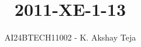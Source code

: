 \documentclass[journal,9pt,onecolumn]{IEEEtran}
\begin{document}

\vspace{3cm}
\title{2011-XE-1-13}
\author{AI24BTECH11002 - K. Akshay Teja}
\maketitle
 \bigskip
{\let\newpage\relax\maketitle}

\renewcommand{\thefigure}{\theenumi}
\renewcommand{\thetable}{\theenumi}
\setlength{\intextsep}{10pt} %

\renewcommand{\thetable}{\theenumi}
\end{document}
